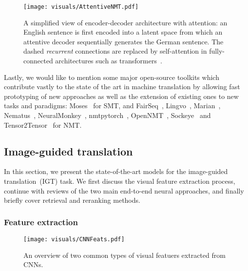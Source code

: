 \documentclass{svjour3}
\begin{document}
\begin{figure}[t]
    \centering
    \texttt{[image: visuals/AttentiveNMT.pdf]}
    \caption{A simplified view of encoder-decoder architecture with attention: an English sentence is first encoded into a latent space from which an attentive decoder sequentially generates the German sentence. The dashed \emph{recurrent} connections are replaced by self-attention in fully-connected architectures such as transformers~\citep{vaswani-attention-2017}.}
    \label{fig:unimodal-mt:encdec}
\end{figure}






Lastly, we would like to mention some major open-source toolkits which contribute vastly to the state of the art in machine translation by allowing fast prototyping of new approaches as well as the extension of existing ones to new tasks and paradigms:
Moses~\citep{koehn-moses:-2007} for SMT, and FairSeq~\citep{ott-fairseq-2019}, Lingvo~\citep{shen-lingvo-2019}, Marian~\citep{junczys-dowmunt-marian:-2018}, Nematus~\citep{sennrich-nematus-2017}, NeuralMonkey~\citep{helcl-neuralmonkey-2018}, nmtpytorch~\citep{caglayan-nmtpy-2017}, OpenNMT~\citep{klein-opennmt:-2017}, Sockeye~\citep{hieber-sockeye:-2017} and Tensor2Tensor~\citep{vaswani-tensor2tensor-2018} for NMT.



















%
     
\subsection{Image-guided translation}
    \label{sec:ict}
    In this section, we present the state-of-the-art models for the image-guided translation~(IGT) task. We first discuss the visual feature extraction process, continue with reviews of the two main end-to-end neural approaches, and finally briefly cover retrieval and reranking methods.


\subsubsection{Feature extraction}
\label{sec:tasks:ict:feat}
\begin{figure}[t]
    \centering
    \texttt{[image: visuals/CNNFeats.pdf]}
\caption{An overview of two common types of visual featuers extracted from CNNs.}
    \label{fig:ict:cnnfeats}
\end{figure}
\end{document}
